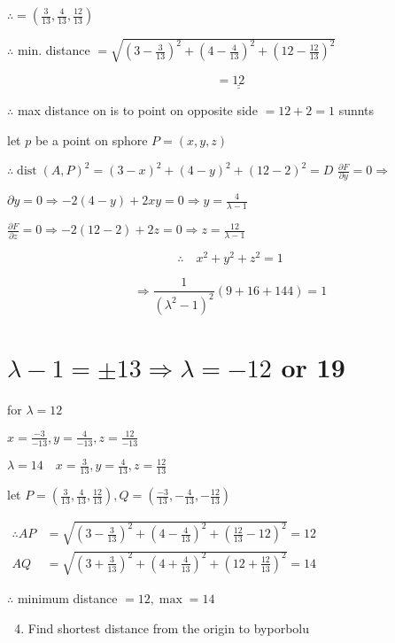 \documentclass[12pt, a4paper]{article}
\begin{document}
$\therefore=\left(\frac{3}{13}, \frac{4}{13}, \frac{12}{13}\right)$

$\therefore$ min. distance $=\sqrt{\left(3-\frac{3}{13}\right)^{2}+\left(4-\frac{4}{13}\right)^{2}+\left(12-\frac{12}{13}\right)^{2}}$

$$
=\underline{\underline{12}}
$$

$\therefore$ max distance on is to point on opposite side $=12+2=1$ sunnts

let $p$ be a point on sphore $P=(x, y, z)$

$\therefore \operatorname{dist}(A, P)^{2}=(3-x)^{2}+(4-y)^{2}+(12-2)^{2}=D$ $\frac{\partial F}{\partial y}=0 \Rightarrow$

$\partial y=0 \Rightarrow-2(4-y)+2 x y=0 \Rightarrow y=\frac{4}{\lambda-1}$

$\frac{\partial F}{\partial z}=0 \Rightarrow-2(12-2)+2 z=0 \Rightarrow z=\frac{12}{\lambda-1}$

$$
\therefore \quad x^{2}+y^{2}+z^{2}=1
$$

$$
\Rightarrow \frac{1}{\left(\lambda^{2}-1\right)^{2}}(9+16+144)=1
$$

\section*{$\lambda-1= \pm 13 \Rightarrow \lambda=-12$ or 19}
for $\lambda=12$

$x=\frac{-3}{-13}, y=\frac{4}{-13}, z=\frac{12}{-13}$

$\lambda=14 \quad x=\frac{3}{13}, y=\frac{4}{13}, z=\frac{12}{13}$

let $P=\left(\frac{3}{13}, \frac{4}{13}, \frac{12}{13}\right), Q=\left(\frac{-3}{13},-\frac{4}{13},-\frac{12}{13}\right)$

$\begin{aligned} \therefore A P & =\sqrt{\left(3-\frac{3}{13}\right)^{2}+\left(4-\frac{4}{13}\right)^{2}+\left(\frac{12}{13}-12\right)^{2}}=12 \\ A Q & =\sqrt{\left(3+\frac{3}{13}\right)^{2}+\left(4+\frac{4}{13}\right)^{2}+\left(12+\frac{12}{13}\right)^{2}}=14\end{aligned}$

$\therefore$ minimum distance $=12, \max =14$

\begin{enumerate}
  \setcounter{enumi}{3}
  \item Find shortest distance from the origin to byporbolu
\end{enumerate}
\end{document}
